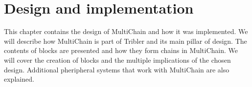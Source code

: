 \chapter{Design and implementation}
This chapter contains the design of MultiChain and how it was implemented.
We will describe how MultiChain is part of Tribler and its main pillar of design.
The contents of blocks are presented and how they form chains in MultiChain.
We will cover the creation of blocks and the multiple implications of the chosen design.
Additional pheripheral systems that work with MultiChain are also explained.











